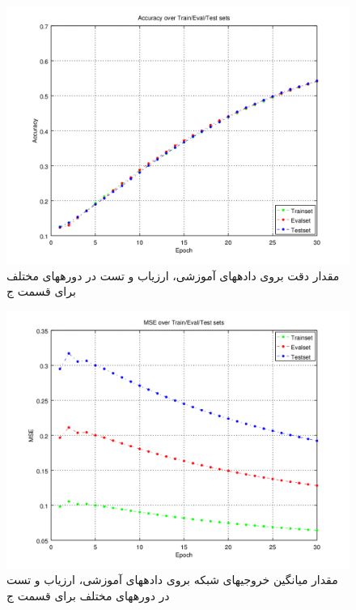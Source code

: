 \documentclass[10pt,a4paper]{article}
\newcommand{\نیمفاصله}{\halfspace}
\renewcommand{\ }{\halfspace}
\newcommand{\بپ}{انتشار-به-عقب }
\newcommand{\منست}{\lr{MNIST} }
\newcommand{\مسی}{\lr{MSE} }
\newcommand{\فوتنت}[1]{\footnote{\lr{#1}}}
\begin{document}
\begin{figure}[h!]
\centering
\includegraphics[width=.9\textwidth]{3_mom_acc}
\caption{مقدار دقت بروی داده\ های آموزشی، ارزیاب و تست در دوره\ های مختلف برای قسمت ج}\label{fig:section_c_mom_acc}
\end{figure}
\begin{figure}[h!]
\centering
\includegraphics[width=.9\textwidth]{3_mom_mse}
\caption{مقدار میانگین \مسی خروجی\ های شبکه بروی داده\ های آموزشی، ارزیاب و تست در دوره\ های مختلف برای قسمت ج}\label{fig:section_c_mom_mse}
\end{figure}
\end{document}
